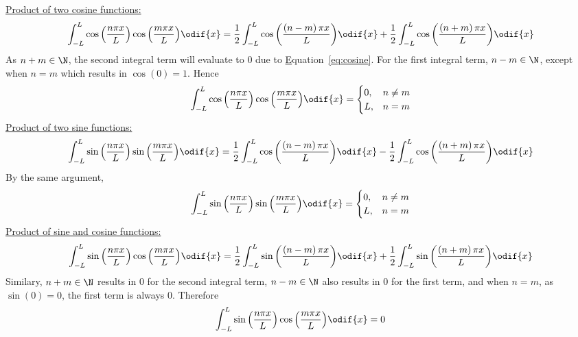 \documentclass{article}
\begin{document}
\underline{Product of two cosine functions:}
\begin{equation*}
    \int_{-L}^L \cos{\left( \frac{n \pi x}{L} \right)} \cos{\left( \frac{m \pi x}{L} \right)} \odif{x} = \frac{1}{2} \int_{-L}^L \cos{\left( \frac{\left( n - m \right) \pi x}{L} \right)} \odif{x} + \frac{1}{2} \int_{-L}^L \cos{\left( \frac{\left( n + m \right) \pi x}{L} \right)} \odif{x}
\end{equation*}
As \(n + m \in \N\), the second integral term will evaluate to \(0\) due to \hyperref[eq:cosine]Equation~{\ref{eq:cosine}}.
For the first integral term, \(n - m \in \N\), except when \(n = m\) which results in \(\cos{\left( 0 \right)} = 1\).
Hence
\begin{equation*}
    \int_{-L}^L \cos{\left( \frac{n \pi x}{L} \right)} \cos{\left( \frac{m \pi x}{L} \right)} \odif{x} = \begin{cases}
        0, & n \neq m \\
        L, & n = m
    \end{cases}
\end{equation*}
\underline{Product of two sine functions:}
\begin{equation*}
    \int_{-L}^L \sin{\left( \frac{n \pi x}{L} \right)} \sin{\left( \frac{m \pi x}{L} \right)} \odif{x} = \frac{1}{2} \int_{-L}^L \cos{\left( \frac{\left( n - m \right) \pi x}{L} \right)} \odif{x} - \frac{1}{2} \int_{-L}^L \cos{\left( \frac{\left( n + m \right) \pi x}{L} \right)} \odif{x}
\end{equation*}
By the same argument,
\begin{equation*}
    \int_{-L}^L \sin{\left( \frac{n \pi x}{L} \right)} \sin{\left( \frac{m \pi x}{L} \right)} \odif{x} = \begin{cases}
        0, & n \neq m \\
        L, & n = m
    \end{cases}
\end{equation*}
\underline{Product of sine and cosine functions:}
\begin{equation*}
    \int_{-L}^L \sin{\left( \frac{n \pi x}{L} \right)} \cos{\left( \frac{m \pi x}{L} \right)} \odif{x} = \frac{1}{2} \int_{-L}^L \sin{\left( \frac{\left( n - m \right) \pi x}{L} \right)} \odif{x} + \frac{1}{2} \int_{-L}^L \sin{\left( \frac{\left( n + m \right) \pi x}{L} \right)} \odif{x}
\end{equation*}
Similary, \(n + m \in \N\) results in \(0\) for the second integral term, \(n - m \in \N\) also results in \(0\) for the first term, and when \(n = m\), as \(\sin{\left( 0 \right)} = 0\), the first term is always \(0\).
Therefore
\begin{equation*}
    \int_{-L}^L \sin{\left( \frac{n \pi x}{L} \right)} \cos{\left( \frac{m \pi x}{L} \right)} \odif{x} = 0
\end{equation*}
\end{document}
